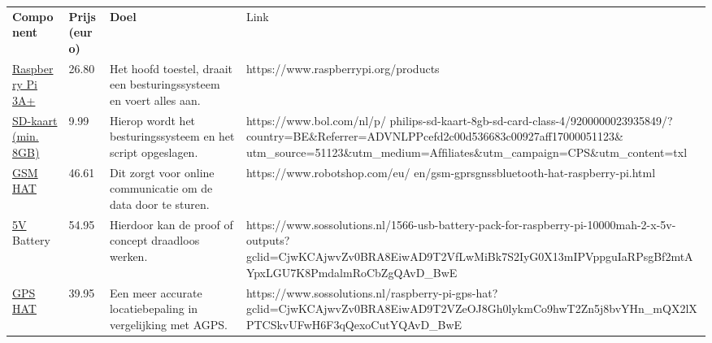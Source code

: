 \begin{table}[]
	\begin{tabular}{llll}
		\textbf{Component}           & \textbf{Prijs (euro)} & \textbf{Doel}                                                                & Link                                                                                                                                                                                                                             \\
		\href{https://www.raspberrypi.org/products}{Raspberry Pi 3A+}    & 26.80        & Het hoofd toestel, draait een besturingssysteem en voert alles aan. & https://www.raspberrypi.org/products                                                                                                                                                                                             \\
		\href{https://www.bol.com/nl/p/ philips-sd-kaart-8gb-sd-card-class-4/9200000023935849/?country=BE\&Referrer=ADVNLPPcefd2c00d536683c00927aff17000051123\& utm\_source=51123\&utm\_medium=Afﬁliates\&utm\_campaign=CPS\&utm\_content=txl}{SD-kaart (min. 8GB)} & 9.99         & Hierop wordt het besturingssysteem en het script opgeslagen.        & https://www.bol.com/nl/p/ philips-sd-kaart-8gb-sd-card-class-4/9200000023935849/?country=BE\&Referrer=ADVNLPPcefd2c00d536683c00927aff17000051123\& utm\_source=51123\&utm\_medium=Afﬁliates\&utm\_campaign=CPS\&utm\_content=txl \\
		\href{https://www.robotshop.com/eu/ en/gsm-gprsgnssbluetooth-hat-raspberry-pi.html}{GSM HAT}             & 46.61        & Dit zorgt voor online communicatie om de data door te sturen.       & https://www.robotshop.com/eu/ en/gsm-gprsgnssbluetooth-hat-raspberry-pi.html                                                                                                                                                     \\
		\href{https://www.sossolutions.nl/1566-usb-battery-pack-for-raspberry-pi-10000mah-2-x-5v-outputs?gclid=CjwKCAjwvZv0BRA8EiwAD9T2VfLwMiBk7S2IyG0X13mIPVppguIaRPsgBf2mtAYpxLGU7K8PmdalmRoCbZgQAvD\_BwE}{5V} Battery          & 54.95        & Hierdoor kan de proof of concept draadloos werken.                  & https://www.sossolutions.nl/1566-usb-battery-pack-for-raspberry-pi-10000mah-2-x-5v-outputs?gclid=CjwKCAjwvZv0BRA8EiwAD9T2VfLwMiBk7S2IyG0X13mIPVppguIaRPsgBf2mtAYpxLGU7K8PmdalmRoCbZgQAvD\_BwE                                    \\
		\href{https://www.sossolutions.nl/raspberry-pi-gps-hat?gclid=CjwKCAjwvZv0BRA8EiwAD9T2VZeOJ8Gh0lykmCo9hwT2Zn5j8bvYHn\_mQX2lXPTCSkvUFwH6F3qQexoCutYQAvD\_BwE}{GPS HAT}             & 39.95        & Een meer accurate locatiebepaling in vergelijking met AGPS.         & https://www.sossolutions.nl/raspberry-pi-gps-hat?gclid=CjwKCAjwvZv0BRA8EiwAD9T2VZeOJ8Gh0lykmCo9hwT2Zn5j8bvYHn\_mQX2lXPTCSkvUFwH6F3qQexoCutYQAvD\_BwE                                                                             \\

\end{tabular}
\end{table}
